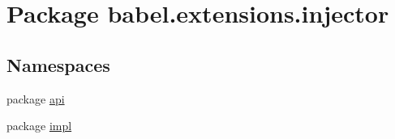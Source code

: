 \hypertarget{namespacebabel_1_1extensions_1_1injector}{\section{Package babel.\-extensions.\-injector}
\label{namespacebabel_1_1extensions_1_1injector}
}
\subsection*{Namespaces}
\begin{DoxyCompactItemize}
\item 
package \hyperlink{namespacebabel_1_1extensions_1_1injector_1_1api}{api}
\item 
package \hyperlink{namespacebabel_1_1extensions_1_1injector_1_1impl}{impl}
\end{DoxyCompactItemize}
